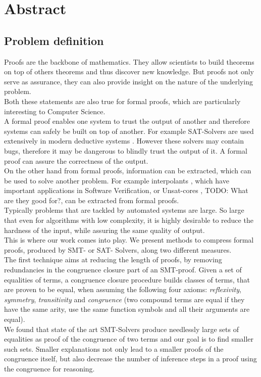 \chapter*{Abstract}

\section{Problem definition}

Proofs are the backbone of mathematics. 
They allow scientists to build theorems on top of others theorems and thus discover new knowledge.
But proofs not only serve as assurance, they can also provide insight on the nature of the underlying problem.\\
Both these statements are also true for formal proofs, which are particularly interesting to Computer Science.\\
A formal proof enables one system to trust the output of another and therefore systems can safely be built on top of another. 
For example SAT-Solvers are used extensively in modern deductive systems \cite{TODO}. 
However these solvers may contain bugs, therefore it may be dangerous to blindly trust the output of it.
A formal proof can assure the correctness of the output.\\
On the other hand from formal proofs, information can be extracted, which can be used to solve another problem.
For example interpolants \cite{TODO}, which have important applications in Software Verification, or Unsat-cores \cite{TODO}, TODO: What are they good for?, can be extracted from formal proofs.\\

Typically problems that are tackled by automated systems are large. 
So large that even for algorithms with low complexity, it is highly desirable to reduce the hardness of the input, while assuring the same quality of output.\\
This is where our work comes into play.
We present methods to compress formal proofs, produced by SMT- or SAT- Solvers, along two different measures.\\

The first technique aims at reducing the length of proofs, by removing redundancies in the congruence closure part of an SMT-proof.
Given a set of equalities of terms, a congruence closure procedure builds classes of terms, that are proven to be equal, when assuming the following four axioms: \emph{reflexivity}, \emph{symmetry}, \emph{transitivity} and \emph{congruence} (two compound terms are equal if they have the same arity, use the same function symbols and all their arguments are equal).\\
We found that state of the art SMT-Solvers produce needlessly large sets of equalities as proof of the congruence of two terms 
and our goal is to find smaller such sets.
Smaller explanations not only lead to a smaller proofs of the congruence itself, 
but also decrease the number of inference steps in a proof using the congruence for reasoning.\\

